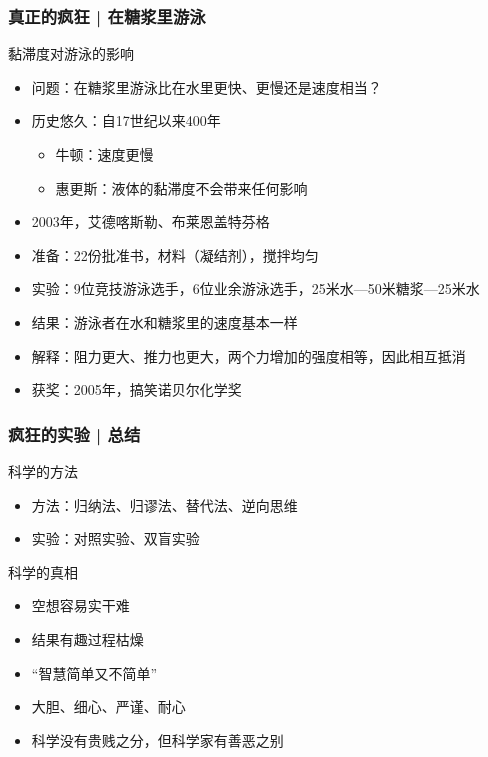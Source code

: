 \begin{frame}
  \frametitle{真正的疯狂 | 在糖浆里游泳}
  \begin{block}{黏滞度对游泳的影响}
    \begin{itemize}
      \item 问题：在糖浆里游泳比在水里更快、更慢还是速度相当？
    \pause
      \item 历史悠久：自17世纪以来400年
        \begin{itemize}
          \item 牛顿：速度更慢
          \item 惠更斯：液体的黏滞度不会带来任何影响
        \end{itemize}
      \item 2003年，艾德\textbullet 喀斯勒、布莱恩盖\textbullet 特芬格
      \item 准备：22份批准书，材料（凝结剂），搅拌均匀
      \item 实验：9位竞技游泳选手，6位业余游泳选手，25米水—50米糖浆—25米水
      \item 结果：游泳者在水和糖浆里的速度基本一样
      \item 解释：阻力更大、推力也更大，两个力增加的强度相等，因此相互抵消
      \item 获奖：2005年，搞笑诺贝尔化学奖
    \end{itemize}
  \end{block}
\end{frame}

\begin{frame}
  \frametitle{疯狂的实验 | 总结}
  \begin{block}{科学的方法}
    \begin{itemize}
      \item 方法：归纳法、归谬法、替代法、逆向思维
      \item 实验：对照实验、双盲实验
    \end{itemize}
  \end{block}
  \pause
  \begin{block}{科学的真相}
    \begin{itemize}
      \item 空想容易实干难
      \item 结果有趣过程枯燥
      \item “智慧简单又不简单”
      \item 大胆、细心、严谨、耐心
      \item 科学没有贵贱之分，但科学家有善恶之别
    \end{itemize}
  \end{block}
\end{frame}



